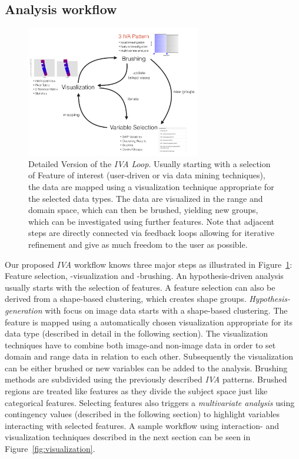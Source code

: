 \documentclass[journal]{style/vgtc} 			          %
\begin{document}
\subsection{Analysis workflow}
\begin{figure}[htb]
 \centering
 \includegraphics[width=3.0in]{figures/InteractionLoop}
 \caption{Detailed Version of the \emph{IVA Loop}. Usually starting with a selection of Feature of interest (user-driven or via data mining techniques), the data are mapped using a visualization technique appropriate for the selected data types. The data are visualized in the range and domain space, which can then be brushed, yielding new groups, which can be investigated using further features. Note that adjacent steps are directly connected via feedback loops allowing for iterative refinement and give as much freedom to the user as possible.}
 \label{fig:InteractionLoop}
\end{figure}
Our proposed \emph{IVA} workflow knows three major steps as illustrated in Figure~\ref{fig:InteractionLoop}: Feature selection, -visualization and -brushing.
%
An hypothesis-driven analysis usually starts with the selection of features.
%
A feature selection can also be derived from a shape-based clustering, which creates shape groups.
%
\emph{Hypothesis-generation} with focus on image data starts with a shape-based clustering.
%
The feature is mapped using a automatically chosen visualization appropriate for its data type (described in detail in the following section).
%
The visualization techniques have to combine both image-and non-image data in order to set domain and range data in relation to each other.
%
Subsequently the visualization can be either brushed or new variables can be added to the analysis.
%
Brushing methods are subdivided using the previously described \emph{IVA} patterns.
%
Brushed regions are treated like features as they divide the subject space just like categorical features. %
%
Selecting features also triggers a \emph{multivariate analysis} using contingency values (described in the following section) to highlight variables interacting with selected features.
%
%
%
A sample workflow using interaction- and visualization techniques described in the next section can be seen in Figure~\ref{fig:visualization}.
\end{document}
